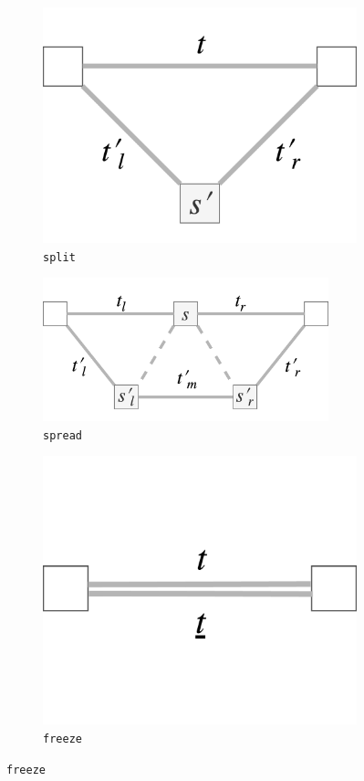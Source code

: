 \documentclass[12pt,a4paper,twoside,openright]{report} \usepackage[pdfborder={0 0 0}]{hyperref}    %
\theoremstyle{definition} \newtheorem{definition}{Definition}[section]
\begin{document}
  \begin{figure}[h] \centering \begin{subfigure}[t]{.28\textwidth}
    \centering\includegraphics[keepaspectratio,width=\textwidth]{prep/outer/split} \caption{\texttt{split}}
    \label{fig:splitOp} \end{subfigure} \begin{subfigure}[t]{.46\textwidth}
    \centering\includegraphics[keepaspectratio,width=0.91\textwidth]{prep/outer/spread} \caption{\texttt{spread}}
    \label{fig:spreadOP} \end{subfigure} \begin{subfigure}[t]{.24\textwidth}
  \centering\includegraphics[keepaspectratio,width=\textwidth]{prep/outer/freeze} \caption{\texttt{freeze}}

\end{subfigure}
\end{figure}
\end{document}

